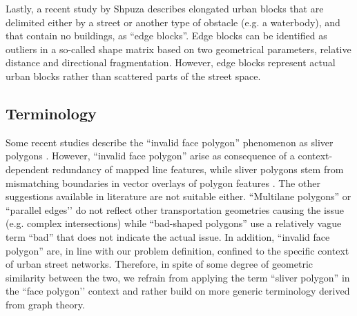 Lastly, a recent study by Shpuza \cite{shpuza_shape_2022} describes elongated urban
blocks that are delimited either by a street or another type of obstacle (e.g. a
waterbody), and that contain no buildings, as ``edge blocks''. Edge blocks can be
identified as outliers in a so-called shape matrix based on two geometrical parameters,
relative distance and directional fragmentation. However, edge blocks represent actual
urban blocks rather than scattered parts of the street space.

\subsection*{Terminology}

Some recent studies describe the ``invalid face polygon'' phenomenon as sliver polygons
\cite{grippa_mapping_2018, sanzana_decomposition_2018, ludwig_mapping_2021}. However,
``invalid face polygon'' arise as consequence of a context-dependent redundancy of mapped line
features, while sliver polygons stem from mismatching boundaries in vector overlays of
polygon features \cite{goodchild_statistical_1978, fischer_using_1993,
delafontaine_assessment_2009}. The other suggestions available in
literature are not suitable either. ``Multilane polygons'' \cite{li_polygon-based_2014}
or ``parallel edges’’ \cite{vybornova_automated_2022} do not reflect other
transportation geometries causing the issue (e.g. complex intersections) while
``bad-shaped polygons'' use a relatively vague term ``bad'' that does not indicate the
actual issue. In addition, ``invalid face polygon'' are, in line with our problem
definition, confined to the specific context of urban street networks. Therefore, in
spite of some degree of geometric similarity between the two, we refrain from applying
the term ``sliver polygon'' in the ``face polygon’’ context and rather build on more
generic terminology derived from graph theory.

